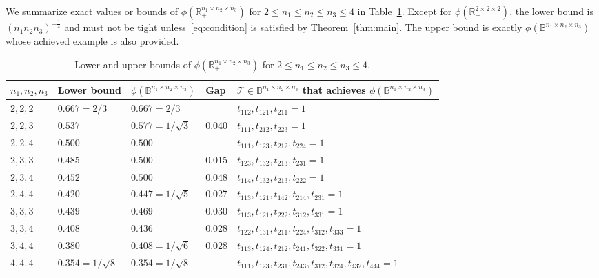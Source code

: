 \documentclass[11pt]{article}
\newcommand{\BB}{\mathbb{B}}
\newcommand{\R}{\mathbb{R}}
\newcommand{\TT}{\mathcal{T}}
\begin{document}
We summarize exact values or bounds of $\phi(\R^{n_1\times n_2\times n_3}_+)$ for $2\le n_1\le n_2\le n_3\le 4$ in Table~\ref{table:234}. Except for $\phi(\R^{2\times 2\times 2}_+)$, the lower bound is $(n_1n_2n_3)^{-\frac{1}{4}}$ and must not be tight unless~\eqref{eq:condition} is satisfied by Theorem~\ref{thm:main}. The upper bound is exactly $\phi(\BB^{n_1\times n_2\times n_3})$ whose achieved example is also provided.
\begin{table}[ht]
    \centering
    \begin{tabular}{|l|l|l|l|l|}
\hline
$n_1,n_2,n_3$ & Lower bound & $\phi(\BB^{n_1\times n_2\times n_3})$ & Gap & $\TT\in\BB^{n_1\times n_2\times n_3}$ that achieves $\phi(\BB^{n_1\times n_2\times n_3})$ \\
\hline
$2, 2, 2$ & $0.667=2/3$ & $0.667=2/3$ &  & $t_{112}, t_{121}, t_{211}=1$ \\
$2, 2, 3$ & $0.537$ & $0.577=1/\sqrt{3}$ & 0.040 & $t_{111}, t_{212}, t_{223}=1$ \\
$2, 2, 4$ & $0.500$ & $0.500$ &  & $t_{111}, t_{123}, t_{212}, t_{224}=1$\\
$2, 3, 3$ & $0.485$ & $0.500$ & 0.015 & $t_{123}, t_{132}, t_{213}, t_{231}=1$\\
$2, 3, 4$ & $0.452$ & $0.500$ & 0.048 & $t_{114}, t_{132}, t_{213}, t_{222}=1$\\
$2, 4, 4$ & $0.420$ & $0.447=1/\sqrt{5}$ & 0.027 & $t_{113}, t_{121}, t_{142}, t_{214}, t_{231}=1$ \\
$3, 3, 3$ & $0.439$ & 0.469  & 0.030 & $t_{113}, t_{121}, t_{222}, t_{312}, t_{331}=1$ \\
$3, 3, 4$ & $0.408$ & 0.436  & 0.028 & $t_{122}, t_{131}, t_{211}, t_{224}, t_{312},  t_{333}=1$  \\
$3, 4, 4$ & $0.380$ & $0.408=1/\sqrt{6}$  & 0.028 & $
t_{113}, t_{124}, t_{212}, t_{241}, t_{322}, t_{331} =1$ \\
$4, 4, 4$ & $0.354=1/\sqrt{8}$ & $0.354=1/\sqrt{8}$ & &  $t_{111} , t_{123} , t_{231} , t_{243} , t_{312} , t_{324} , t_{432} , t_{444}=1$  \\
\hline
\end{tabular}
\caption{Lower and upper bounds of $\phi(\R^{n_1\times n_2\times n_3}_+)$ for $2\le n_1\le n_2\le n_3\le 4$.} \label{table:234}
\end{table}
\end{document}
